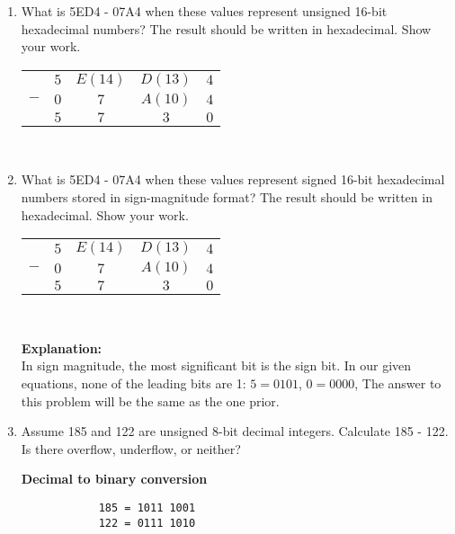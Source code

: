 \documentclass{article}
\begin{document}
\begin{enumerate}
\begin{center}
        \end{center}
        \item What is 5ED4 - 07A4 when these values represent unsigned 16-bit hexadecimal numbers? The result should be written in hexadecimal. Show your work.
        \begin{center}
            \begin{tabular}{c c c c c}
                    & $5$ & $E(14)$ & $D(13)$ & $4$\\
                $-$ & $0$ & $7$ & $A(10)$ & $4$\\
                \hline
                & $5$ & $7$ & $3$ & $0$\\
            \end{tabular}\\[0.25in]
        \end{center}

        \item What is 5ED4 - 07A4 when these values represent signed 16-bit hexadecimal numbers stored in sign-magnitude format? The result should be written in hexadecimal. Show your work.
        \begin{center}
            \begin{tabular}{c c c c c}
                    & $5$ & $E(14)$ & $D(13)$ & $4$\\
                $-$ & $0$ & $7$ & $A(10)$ & $4$\\
                \hline
                & $5$ & $7$ & $3$ & $0$\\
            \end{tabular}\\[0.25in]
        \end{center}

        \textbf{Explanation:}\\
        In sign magnitude, the most significant bit is the sign bit. In our given equations, none of the leading bits are 1: $5 = 0101$, $0 = 0000$, The answer to this problem will be the same as the one prior.

        \item Assume 185 and 122 are unsigned 8-bit decimal integers. Calculate 185 - 122. Is there overflow, underflow, or neither?
        
        \textbf{Decimal to binary conversion}
        \begin{verbatim}
            185 = 1011 1001
            122 = 0111 1010
        \end{verbatim}


\end{enumerate}
\end{document}
